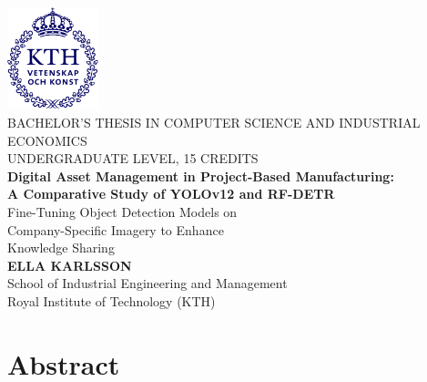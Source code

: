 \documentclass[a4paper,10pt,twocolumn]{article}
\numberwithin{figure}{section}
\numberwithin{table}{section}
\begin{document}
\clearpage
{}  %

\setlength{\headheight}{14.5pt}
\begin{titlepage}
    \centering
    \includegraphics[width=0.2\textwidth]{kthLogga.png}\\[1cm]
    {\large BACHELOR’S THESIS IN COMPUTER SCIENCE AND INDUSTRIAL ECONOMICS}\\[0.5cm]
    {\large UNDERGRADUATE LEVEL, 15 CREDITS}\\[2.5cm]
    
    \linespread{0.9}\selectfont %
    {\Huge \textbf{Digital Asset Management in Project-Based Manufacturing: \\ 
    A Comparative Study of YOLOv12 and RF-DETR}}\\[0.7cm]
    {\Large Fine-Tuning Object Detection Models on \\ Company-Specific Imagery 
    to Enhance \\ Knowledge Sharing}\\[1cm]
    \vfill
    {\large \textbf{ELLA KARLSSON}}\\[1cm]
    \vfill
    {\large School of Industrial Engineering and Management}\\
    {\large Royal Institute of Technology (KTH)}\\
\end{titlepage}


\newpage
{}
\onecolumn
{} 
\section*{Abstract}
\end{document}
